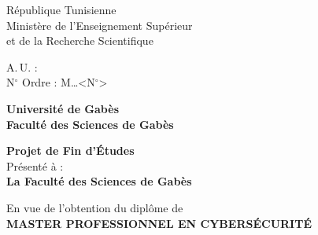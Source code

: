 \begin{titlepage}
\thispagestyle{empty}
\raggedbottom
\enlargethispage{4cm}

\noindent
\begin{minipage}[t]{0.62\linewidth}
  \begin{flushleft}
    \small République Tunisienne\\[2pt]
    \small Ministère de l'Enseignement Supérieur\\[2pt]
    \small et de la Recherche Scientifique
  \end{flushleft}
\end{minipage}\hfill
\begin{minipage}[t]{0.36\linewidth}
  \begin{flushright}
    \small A.\,U. : \annee\\[2pt]
    \small N$^\circ$ Ordre : M\dots<N$^\circ$>
  \end{flushright}
\end{minipage}

\vspace{0.7cm}

\begin{center}


  {\Large\bfseries Université de Gabès}\\[4pt]
  {\large\bfseries Faculté des Sciences de Gabès}

  \vspace{0.9cm}

  {\LARGE\bfseries Projet de Fin d'Études}\\[8pt]
  {\normalsize Présenté à :}\\[4pt]
  {\large\bfseries La Faculté des Sciences de Gabès}\\[2pt]
  {\normalsize \departement}

  \vspace{0.6cm}
  {\normalsize En vue de l'obtention du diplôme de}\\[6pt]
  {\Large\bfseries MASTER PROFESSIONNEL EN CYBERSÉCURITÉ}


\end{center}
\end{titlepage}
